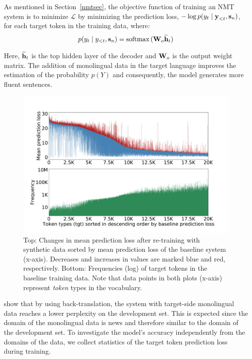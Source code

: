 As mentioned in Section~\ref{nmtsec}, the objective function of training an NMT system is to minimize $\mathcal{L}$ by minimizing the prediction loss, $-\log p(y_t \mid \bm{\mathbf{y}}_{<t}, \bm{\mathbf{s}}_n)$, for each target token in the training data, where:
\begin{align}
p(y_t \mid y_{<t}, \bm{\mathbf{s}}_n) =  \operatorname*{softmax} \,(\bm{\mathbf{W}}_o\widetilde{\bm{\mathbf{h}}}_t)
\end{align}

\noindent Here, $\widetilde{\bm{\mathbf{h}}}_t$ is the top hidden layer of the decoder and $\bm{\mathbf{W}}_o$ is the output weight matrix. 
The addition of monolingual data in the target language improves the estimation of the probability $p({Y})$ and consequently, the model generates more fluent sentences.

\begin{figure}[htb!]
\centering
\includegraphics[width=\textwidth]{05-research-03/figs/newattemptoneall2}
\caption{Top: Changes in mean prediction loss after re-training with synthetic data sorted by mean prediction loss of the baseline system (x-axis). Decreases and increases in values are marked blue and red, respectively. Bottom: Frequencies (log) of target tokens in the baseline training data. Note that data points in both plots (x-axis) represent \textit{token} types in the vocabulary.}
\label{loss}
\end{figure}

\citet{sennrich-haddow-birch:2016:P16-11} show that by using back-translation, the system with target-side monolingual data reaches a lower perplexity on the development set.
This is expected since the domain of the monolingual data is news and therefore similar to the domain of the development set.
To investigate the model's accuracy independently from the domains of the data, we collect statistics of the target token prediction loss during training.

